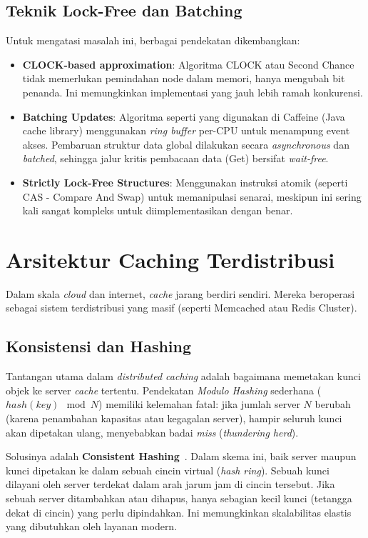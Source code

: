\subsection{Teknik Lock-Free dan Batching}
Untuk mengatasi masalah ini, berbagai pendekatan dikembangkan:
\begin{itemize}
  \item \textbf{CLOCK-based approximation}: Algoritma CLOCK atau
    Second Chance tidak memerlukan pemindahan node dalam memori, hanya
    mengubah bit penanda. Ini memungkinkan implementasi yang jauh lebih
    ramah konkurensi.
  \item \textbf{Batching Updates}: Algoritma seperti yang digunakan
    di Caffeine (Java cache library) menggunakan \textit{ring buffer}
    per-CPU untuk menampung event akses. Pembaruan struktur data global
    dilakukan secara \textit{asynchronous} dan \textit{batched}, sehingga
    jalur kritis pembacaan data (Get) bersifat \textit{wait-free}.
  \item \textbf{Strictly Lock-Free Structures}: Menggunakan instruksi
    atomik (seperti CAS - Compare And Swap) untuk memanipulasi senarai,
    meskipun ini sering kali sangat kompleks untuk diimplementasikan
    dengan benar.
\end{itemize}

\section{Arsitektur Caching Terdistribusi}
Dalam skala \textit{cloud} dan internet, \textit{cache} jarang berdiri sendiri.
Mereka beroperasi sebagai sistem terdistribusi yang masif (seperti
Memcached atau Redis Cluster).

\subsection{Konsistensi dan Hashing}
Tantangan utama dalam \textit{distributed caching} adalah bagaimana
memetakan kunci objek ke server \textit{cache} tertentu.
Pendekatan \textit{Modulo Hashing} sederhana ($hash(key) \mod N$) memiliki
kelemahan fatal: jika jumlah server $N$ berubah (karena penambahan kapasitas
atau kegagalan server), hampir seluruh kunci akan dipetakan ulang,
menyebabkan badai \textit{miss} (\textit{thundering herd}).

Solusinya adalah \textbf{Consistent Hashing}~\cite{Karger1997Consistent}.
Dalam skema ini, baik server maupun kunci dipetakan ke dalam sebuah
cincin virtual (\textit{hash ring}). Sebuah kunci dilayani oleh server
terdekat dalam arah jarum jam di cincin tersebut.
Jika sebuah server ditambahkan atau dihapus, hanya sebagian kecil kunci
(tetangga dekat di cincin) yang perlu dipindahkan. Ini memungkinkan
skalabilitas elastis yang dibutuhkan oleh layanan modern.

